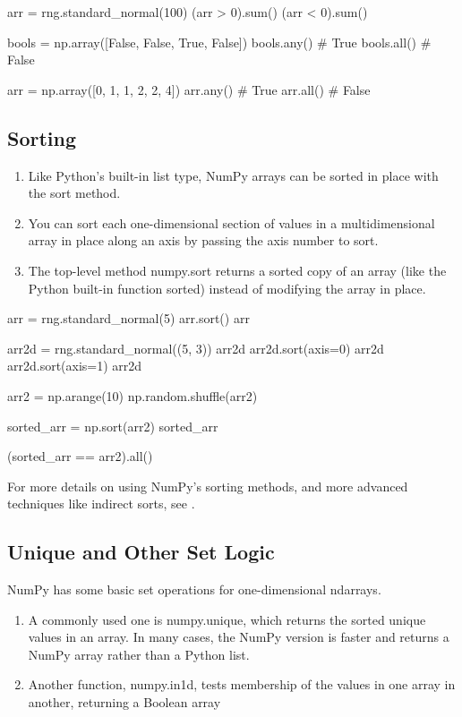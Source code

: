 \begin{pyc}
arr = rng.standard_normal(100)
(arr > 0).sum()
(arr < 0).sum()

bools = np.array([False, False, True, False])
bools.any()
# True
bools.all()
# False

arr = np.array([0, 1, 1, 2, 2, 4])
arr.any()
# True
arr.all()
# False
\end{pyc}
\subsection{Sorting}
\begin{enumerate}
    \item Like Python’s built-in list type, NumPy arrays can be sorted in place with the sort method.
    \item You can sort each one-dimensional section of values in a multidimensional array in place along an axis by passing the axis number to sort.
    \item The top-level method numpy.sort returns a sorted copy of an array (like the Python built-in function sorted) instead of modifying the array in place. 
\end{enumerate}

\begin{pyc}
arr = rng.standard_normal(5)
arr.sort()
arr

arr2d = rng.standard_normal((5, 3))
arr2d
arr2d.sort(axis=0)
arr2d
arr2d.sort(axis=1)
arr2d

arr2 = np.arange(10)
np.random.shuffle(arr2)

sorted_arr = np.sort(arr2)
sorted_arr

(sorted_arr == arr2).all()
\end{pyc}


For more details on using NumPy’s sorting methods, and more advanced techniques like indirect sorts, see .
\subsection{Unique and Other Set Logic}
NumPy has some basic set operations for one-dimensional ndarrays.

\begin{enumerate}
    \item A commonly used one is numpy.unique, which returns the sorted unique values in an array. In many cases, the NumPy version is faster and returns a NumPy array rather than a
    Python list.    
    \item Another function, numpy.in1d, tests membership of the values in one array in another, returning a Boolean array
\end{enumerate}

